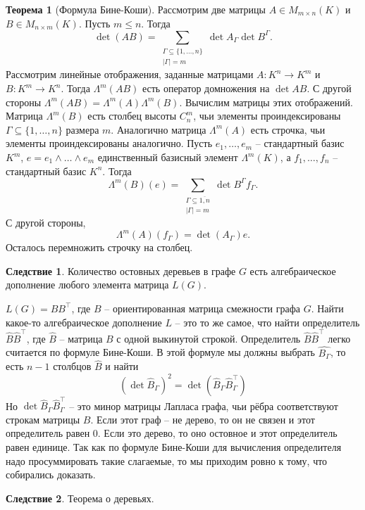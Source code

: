 \documentclass[10pt,a4paper,oneside]{book}
\theoremstyle{definition}
\newtheorem{thm}{\color{red!40!black}Теорема}
\newtheorem{cor}{\color{green!45!black}Следствие}
\renewcommand{\leq}{\leqslant}
\newcommand{\ovl}{\overline}
\def\thrm{\begin{thm}}
\def\ethrm{\end{thm}}
\def\crl{\begin{cor}}
\def\ecrl{\end{cor}}
\begin{document}
\thrm[Формула Бине-Коши] Рассмотрим две матрицы $A\in M_{m\times n}(K)$ и $B\in M_{n\times m}(K)$. Пусть $m\leq n$. Тогда
$$\det(AB)=\sum_{\substack{\Gamma \subseteq \{1,\dots,n\}\\ |\Gamma|=m}} \det A_{\Gamma} \det B^{\Gamma}.$$
\proof Рассмотрим линейные отображения, заданные матрицами $A\colon K^n \to K^m$ и  $B \colon K^m \to K^n$. Тогда $\Lambda^m (AB)$ есть оператор домножения на $\det AB$. С другой стороны $\Lambda^m(AB)=\Lambda^m(A) \Lambda^m(B)$. Вычислим матрицы этих отображений. Матрица $\Lambda^m(B)$ есть столбец высоты $C_n^m$, чьи элементы проиндексированы $\Gamma \subseteq \{1,\dots,n\}$ размера $m$. Аналогично матрица $\Lambda^m(A)$  есть строчка, чьи элементы проиндексированы аналогично.
Пусть $e_1,\dots,e_m$ -- стандартный базис $K^m$, $e=e_1\wedge \dots \wedge e_m$ единственный базисный элемент $\Lambda^m(K)$, а $f_1,\dots,f_n$ -- стандартный базис $K^n$. Тогда 
$$\Lambda^m(B)(e)=\sum_{\substack{\Gamma \subseteq \ovl{1,n} \\ |\Gamma|=m}} \det B^{\Gamma} f_{\Gamma}.$$
 С другой стороны, 
$$\Lambda^m(A)(f_{\Gamma})=\det(A_{\Gamma})e.$$
Осталось перемножить строчку на столбец.
\endproof
\ethrm

\crl Количество остовных деревьев в графе $G$ есть алгебраическое дополнение любого элемента матрица $L(G)$.
\ecrl
\proof $L(G)=BB^\top$, где $B$ -- ориентированная матрица смежности графа $G$. Найти какое-то алгебраическое дополнение $L$ -- это то же самое, что найти определитель $\hat{B}\hat{B}^\top$, где $\hat{B}$ -- матрица $B$ с одной выкинутой строкой. Определитель $\hat B \hat{B}^\top$ легко считается по формуле Бине-Коши. В этой формуле мы должны выбрать $\hat{B_{\Gamma}}$, то есть $n-1$ столбцов $\hat{B}$ и найти
$$(\det \hat{B}_{\Gamma})^2=\det(\hat{B}_{\Gamma} \hat{B}_{\Gamma}^\top)$$
Но $\det \hat{B}_{\Gamma} \hat{B}_{\Gamma}^\top$ -- это минор матрицы Лапласа графа, чьи рёбра соответствуют строкам матрицы $B$. Если этот граф  -- не дерево, то он не связен и этот определитель равен $0$. Если это дерево, то оно остовное и этот определитель равен единице. Так как по формуле Бине-Коши для вычисления определителя надо просуммировать такие слагаемые, то мы приходим ровно к тому, что собирались доказать.
\endproof


\crl Теорема о деревьях.
\ecrl
\end{document}
